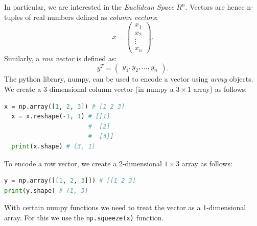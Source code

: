 In particular, we are interested in the \emph{Euclidean Space} $R^{n}$. Vectors
are hence n-tuples of real numbers defined as \emph{column vectors}:
\[x=\begin{pmatrix} x_1\\x_2\\\vdots\\x_n \end{pmatrix}.\] 
Similarly, a \emph{row vector} is defined as:
\[y^{T}=\begin{pmatrix} y_1,y_2,\ldots,y_{n} \end{pmatrix}.\] 
The python library, numpy, can be used to encode a vector using \emph{array}
objects. We create a 3-dimensional column vector (in numpy a $3\times 1$ array)
as follows:
\begin{lstlisting}[language=Python]
  x = np.array([1, 2, 3]) # [1 2 3]
  x = x.reshape(-1, 1) # [[1]
                       #  [2]
                       #  [3]]
  print(x.shape) # (3, 1)
\end{lstlisting}
To encode a row vector, we create a 2-dimensional $1\times 3$ array as follows:
\begin{lstlisting}[language=Python]
y = np.array([[1, 2, 3]]) # [[1 2 3]
print(y.shape) # (1, 3)
\end{lstlisting}
\begin{remark}
With certain numpy functions we need to treat the vector as a 1-dimensional
array. For this we use the \verb!np.squeeze(x)! function.
\end{remark}

